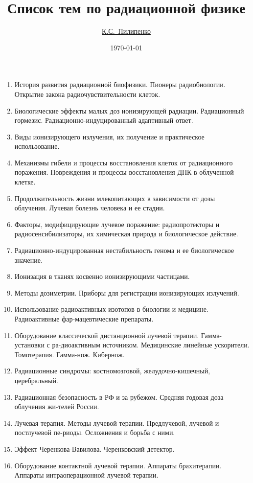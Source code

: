\documentclass[14pt,a4paper]{article}
\title{Список тем по радиационной физике}
\author{\href{mailto:www-kirill.pilipenko@yandex.ru}{К.С.~Пилипенко}} %
\date{\selectlanguage{russian}\today}
\begin{document}
\maketitle
    \begin{enumerate}
        \item История развития радиационной биофизики. Пионеры радиобиологии. Открытие закона радиочувствительности клеток.
        \item Биологические эффекты малых доз ионизирующей радиации. Радиационный гормезис. Радиационно-индуцированный адаптивный ответ.
        \item Виды ионизирующего излучения, их получение и практическое использование.
        \item Механизмы гибели и процессы восстановления клеток от радиационного поражения. Повреждения и процессы восстановления ДНК в облученной клетке. 
        \item Продолжительность жизни млекопитающих в зависимости от дозы облучения. Лучевая болезнь человека и ее стадии. 
        \item Факторы, модифицирующие лучевое поражение: радиопротекторы и радиосенсибилизаторы, их химическая природа и биологическое действие.
        \item Радиационно-индуцированная нестабильность генома и ее биологическое значение.
        \item Ионизация в тканях косвенно ионизирующими частицами.
        \item Методы дозиметрии. Приборы для регистрации ионизирующих излучений.
        \item Использование радиоактивных изотопов в биологии и медицине. Радиоактивные фар-мацевтические препараты.
        \item Оборудование классической дистанционной лучевой терапии. Гамма-установки с ра-диоактивным источником. Медицинские линейные ускорители. Томотерапия. Гамма-нож. Кибернож.
        \item Радиационные синдромы: костномозговой, желудочно-кишечный, церебральный. 
        \item Радиационная безопасность в РФ и за рубежом. Средняя годовая доза облучения жи-телей России.
        \item Лучевая терапия. Методы лучевой терапии. Предлучевой, лучевой и постлучевой пе-риоды. Осложнения и борьба с ними. 
        \item Эффект Черенкова-Вавилова. Черенковский детектор.
        \item Оборудование контактной лучевой терапии. Аппараты брахитерапии.
        Аппараты интраоперационной лучевой терапии.
    \end{enumerate}
\end{document}
